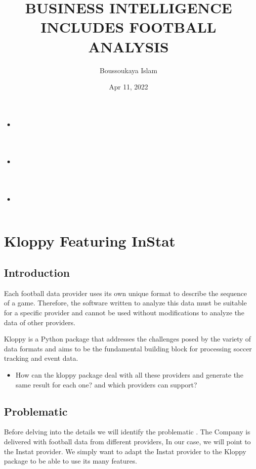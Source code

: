 \documentclass[letterpaper,10pt,english]{jupyterBook}
\title{BUSINESS INTELLIGENCE INCLUDES FOOTBALL ANALYSIS}
\date{Apr 11, 2022}
\author{Boussoukaya Islam}
\begin{document}
\pagestyle{empty}
\sphinxmaketitle
\pagestyle{plain}
\sphinxtableofcontents
\pagestyle{normal}
\label{\detokenize{intro::doc}}

\begin{itemize}
\item {} 
\sphinxAtStartPar
{\hyperref[\detokenize{Chap1/Chap1::doc}]{}}

\item {} 
\sphinxAtStartPar
{\hyperref[\detokenize{Chap2/chap2::doc}]{}}

\item {} 
\sphinxAtStartPar
{\hyperref[\detokenize{Chap3/Chap3::doc}]{}}

\end{itemize}


\chapter{Kloppy Featuring InStat}
\label{\detokenize{Chap1/Chap1:kloppy-featuring-instat}}\label{\detokenize{Chap1/Chap1::doc}}

\section{Introduction}
\label{\detokenize{Chap1/Chap1:introduction}}
\sphinxAtStartPar
Each football data provider uses its own unique format to describe the sequence of a game.
Therefore, the software written to analyze this data must be suitable for a specific provider and cannot be used without modifications to analyze the data of other providers.

\sphinxAtStartPar
Kloppy is a Python package that addresses the challenges posed by the variety of data formats and aims to be the fundamental building block for processing soccer tracking and event data.
\begin{itemize}
\item {} 
\sphinxAtStartPar
How can the kloppy package deal with all these providers and generate the same result for each one? and which providers can support?

\end{itemize}


\section{Problematic}
\label{\detokenize{Chap1/Chap1:problematic}}
\sphinxAtStartPar
Before delving into the details we will identify the problematic . The Company is delivered with football data from different providers, In our case, we will point to the Instat provider. We simply want to adapt the Instat provider to the Kloppy package to be able to use its many features.
\end{document}
